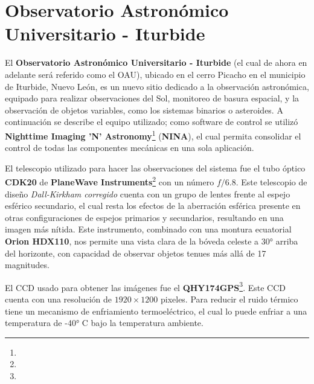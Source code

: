 \section{Observatorio Astronómico Universitario - Iturbide}

El \textbf{Observatorio Astronómico Universitario - Iturbide} (el cual de ahora
en adelante será referido como el OAU), ubicado en el cerro Picacho en el
municipio de Iturbide, Nuevo León, es un nuevo sitio dedicado a la observación
astronómica, equipado para realizar observaciones del Sol, monitoreo de basura
espacial, y la observación de objetos variables, como los sistemas binarios o
asteroides. A continuación se describe el equipo utilizado; como software de
control se utilizó \textbf{Nighttime Imaging 'N'
Astronomy}\footnote{} (\textbf{NINA}), el cual
permita consolidar el control de todas las componentes mecánicas en una sola
aplicación. 

El telescopio utilizado para hacer las observaciones del sistema fue el tubo
óptico \textbf{CDK20} de \textbf{PlaneWave
Instruments}\footnote{} con un
número $f/6.8$. Este telescopio de diseño \textit{Dall-Kirkham corregido} cuenta
con un grupo de lentes frente al espejo esférico secundario, el cual resta los
efectos de la aberración esférica presente en otras configuraciones de espejos
primarios y secundarios, resultando en una imagen más nítida. Este instrumento,
combinado con una montura ecuatorial \textbf{Orion HDX110}, nos permite una
vista clara de la bóveda celeste a \ang{30} arriba del horizonte, con capacidad
de observar objetos tenues más allá de 17 magnitudes.

El CCD usado para obtener las imágenes fue el
\textbf{QHY174GPS}\footnote{}.
Este CCD cuenta con una resolución de $1920 \times 1200$ pixeles. Para reducir
el ruido térmico tiene un mecanismo de enfriamiento termoeléctrico, el cual lo
puede enfriar a una temperatura de -\ang{40} C bajo la temperatura ambiente. 